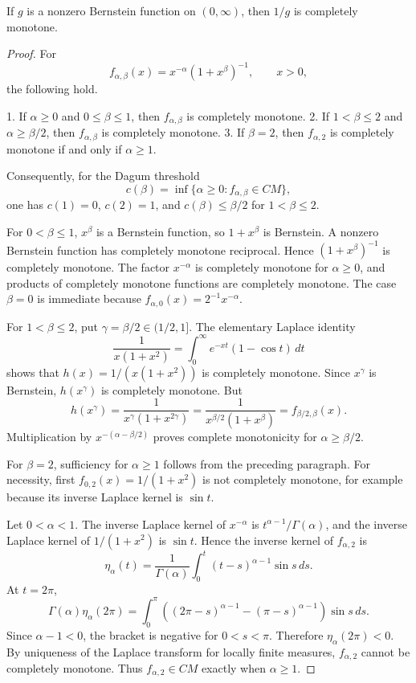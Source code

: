\begin{lemma}
\label{res:bf-reciprocal-is-cm}
If \(g\) is a nonzero Bernstein function on \((0,\infty)\), then \(1/g\) is completely monotone.
\end{lemma}
\begin{proof}
For
\[
f_{\alpha,\beta}(x)=x^{-\alpha}(1+x^\beta)^{-1},\qquad x>0,
\]
the following hold.

1. If \(\alpha\ge0\) and \(0\le\beta\le1\), then \(f_{\alpha,\beta}\) is completely monotone.
2. If \(1<\beta\le2\) and \(\alpha\ge\beta/2\), then \(f_{\alpha,\beta}\) is completely monotone.
3. If \(\beta=2\), then \(f_{\alpha,2}\) is completely monotone if and only if \(\alpha\ge1\).

Consequently, for the Dagum threshold
\[
c(\beta)=\inf\{\alpha\ge0:f_{\alpha,\beta}\in CM\},
\]
one has \(c(1)=0\), \(c(2)=1\), and \(c(\beta)\le\beta/2\) for \(1<\beta\le2\).

For \(0<\beta\le1\), \(x^\beta\) is a Bernstein function, so \(1+x^\beta\) is Bernstein. A nonzero Bernstein function has completely monotone reciprocal. Hence \((1+x^\beta)^{-1}\) is completely monotone. The factor \(x^{-\alpha}\) is completely monotone for \(\alpha\ge0\), and products of completely monotone functions are completely monotone. The case \(\beta=0\) is immediate because \(f_{\alpha,0}(x)=2^{-1}x^{-\alpha}\).

For \(1<\beta\le2\), put \(\gamma=\beta/2\in(1/2,1]\). The elementary Laplace identity
\[
\frac1{x(1+x^2)}=\int_0^\infty e^{-xt}(1-\cos t)\,dt
\]
shows that \(h(x)=1/(x(1+x^2))\) is completely monotone. Since \(x^\gamma\) is Bernstein, \(h(x^\gamma)\) is completely monotone. But
\[
h(x^\gamma)=\frac1{x^\gamma(1+x^{2\gamma})}
=\frac1{x^{\beta/2}(1+x^\beta)}
=f_{\beta/2,\beta}(x).
\]
Multiplication by \(x^{-(\alpha-\beta/2)}\) proves complete monotonicity for \(\alpha\ge\beta/2\).

For \(\beta=2\), sufficiency for \(\alpha\ge1\) follows from the preceding paragraph. For necessity, first \(f_{0,2}(x)=1/(1+x^2)\) is not completely monotone, for example because its inverse Laplace kernel is \(\sin t\).

Let \(0<\alpha<1\). The inverse Laplace kernel of \(x^{-\alpha}\) is \(t^{\alpha-1}/\Gamma(\alpha)\), and the inverse Laplace kernel of \(1/(1+x^2)\) is \(\sin t\). Hence the inverse kernel of \(f_{\alpha,2}\) is
\[
\eta_\alpha(t)=\frac1{\Gamma(\alpha)}\int_0^t(t-s)^{\alpha-1}\sin s\,ds.
\]
At \(t=2\pi\),
\[
\Gamma(\alpha)\eta_\alpha(2\pi)
=\int_0^\pi\left((2\pi-s)^{\alpha-1}-(\pi-s)^{\alpha-1}\right)\sin s\,ds.
\]
Since \(\alpha-1<0\), the bracket is negative for \(0<s<\pi\). Therefore \(\eta_\alpha(2\pi)<0\). By uniqueness of the Laplace transform for locally finite measures, \(f_{\alpha,2}\) cannot be completely monotone. Thus \(f_{\alpha,2}\in CM\) exactly when \(\alpha\ge1\).
\end{proof}

